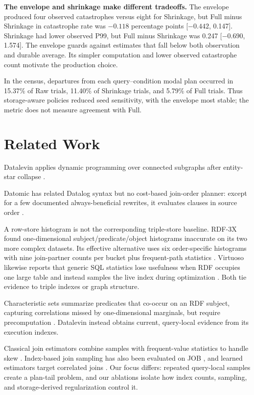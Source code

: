 \documentclass[sigconf]{cidr-2027}
\begin{document}
\textbf{The envelope and shrinkage make different tradeoffs.} The envelope
produced four observed catastrophes versus eight for Shrinkage, but Full minus
Shrinkage in catastrophe rate was $-0.118$ percentage points [$-0.442$,
0.147]. Shrinkage had lower observed P99, but Full minus Shrinkage was 0.247
[$-0.690$, 1.574]. The envelope guards against estimates that fall below both
observation and durable average. Its simpler computation and lower observed
catastrophe count motivate the production choice.

In the census, departures from each query--condition modal plan occurred in
15.37\% of Raw trials, 11.40\% of Shrinkage trials, and 5.79\% of Full trials.
Thus storage-aware policies reduced seed sensitivity, with the envelope most
stable; the metric does not measure agreement with Full.

\section{Related Work}

Datalevin applies dynamic programming over connected subgraphs after
entity-star collapse \cite{selinger1979access,moerkotte2008dynamic}.

Datomic has related Datalog syntax but no cost-based join-order planner: except
for a few documented always-beneficial rewrites, it evaluates clauses in source
order \cite{datomicQueryStats}.

A row-store histogram is not the corresponding triple-store baseline. RDF-3X
found one-dimensional subject/predicate/object histograms inaccurate on its two
more complex datasets. Its effective alternative uses six order-specific
histograms with nine join-partner counts per bucket plus frequent-path
statistics \cite{neumann2010rdf3x}. Virtuoso likewise reports that generic SQL
statistics lose usefulness when RDF occupies one large table and instead
samples the live index during optimization \cite{erlingVirtuoso}. Both tie
evidence to triple indexes or graph structure.

Characteristic sets summarize predicates that co-occur on an RDF subject,
capturing correlations missed by one-dimensional marginals, but require
precomputation \cite{neumann2011characteristic}. Datalevin instead obtains
current, query-local evidence from its execution indexes.

Classical join estimators combine samples with frequent-value statistics to
handle skew \cite{haas1995sampling}. Index-based join sampling has also been
evaluated on JOB \cite{leis2017cardinality}, and learned estimators target
correlated joins \cite{kipf2019learned}. Our focus differs: repeated query-local
samples create a plan-tail problem, and our ablations isolate how index counts,
sampling, and storage-derived regularization control it.
\end{document}
